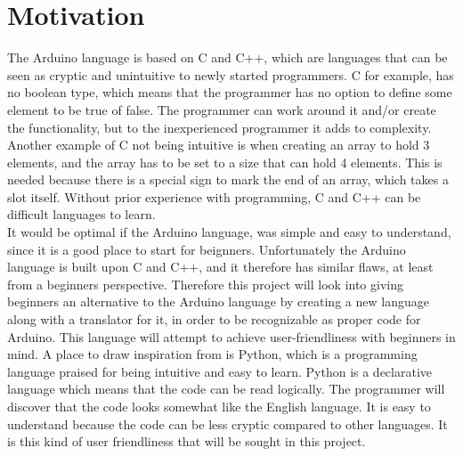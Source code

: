 \section{Motivation}\label{introduction:motivation}
The Arduino language is based on C and C++, which are languages that can be seen as cryptic and unintuitive to newly started programmers. C for example, has no boolean type, which means that the programmer has no option to define some element to be true of false. The programmer can work around it and/or create the functionality, but to the inexperienced programmer it adds to complexity. Another example of C not being intuitive is when creating an array to hold 3 elements, and the array has to be set to a size that can hold 4 elements. This is needed because there is a special sign to mark the end of an array, which takes a slot itself.  Without prior experience with programming, C and C++ can be difficult languages to learn. \\

It would be optimal if the Arduino language, was simple and easy to understand, since it is a good place to start for beignners. Unfortunately the Arduino language is built upon C and C++, and it therefore has similar flaws, at least from a beginners perspective. Therefore this project will look into giving beginners an alternative to the Arduino language by creating a new language along with a translator for it, in order to be recognizable as proper code for Arduino. This language will attempt to achieve user-friendliness with beginners in mind. A place to draw inspiration from is Python, which is a programming language praised for being intuitive and easy to learn. \cite{python:about} Python is a declarative language which means that the code can be read logically. The programmer will discover that the code looks somewhat like the English language. It is easy to understand because the code can be less cryptic compared to other languages. It is this kind of user friendliness that will be sought in this project.